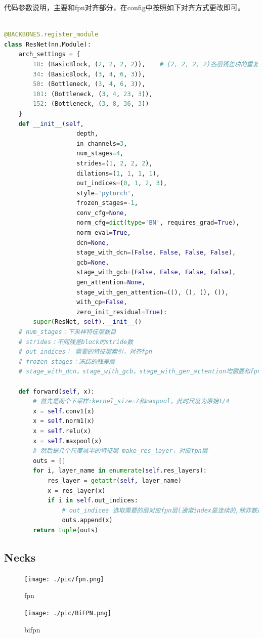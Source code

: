 \documentclass[UTF8]{ctexart}
\begin{document}
代码参数说明，主要和fpn对齐部分，在config中按照如下对齐方式更改即可。
\lstset{style=mystyle}
\begin{lstlisting}[language=Python]

@BACKBONES.register_module
class ResNet(nn.Module):
	arch_settings = {
		18: (BasicBlock, (2, 2, 2, 2)),    # (2, 2, 2, 2)各层残差块的重复数目
		34: (BasicBlock, (3, 4, 6, 3)),
		50: (Bottleneck, (3, 4, 6, 3)),
		101: (Bottleneck, (3, 4, 23, 3)),
		152: (Bottleneck, (3, 8, 36, 3))
	}
	def __init__(self,
					depth,
					in_channels=3,
					num_stages=4,
					strides=(1, 2, 2, 2),
					dilations=(1, 1, 1, 1),
					out_indices=(0, 1, 2, 3),
					style='pytorch',
					frozen_stages=-1,
					conv_cfg=None,
					norm_cfg=dict(type='BN', requires_grad=True),
					norm_eval=True,
					dcn=None,
					stage_with_dcn=(False, False, False, False),
					gcb=None,
					stage_with_gcb=(False, False, False, False),
					gen_attention=None,
					stage_with_gen_attention=((), (), (), ()),
					with_cp=False,
					zero_init_residual=True):
		super(ResNet, self).__init__()
	# num_stages：下采样特征层数目
	# strides：不同残差block的stride数
	# out_indices： 需要的特征层索引，对齐fpn
	# frozen_stages：冻结的残差层
	# stage_with_dcn，stage_with_gcb，stage_with_gen_attention均需要和fpn层对齐

	def forward(self, x):
		# 首先是两个下采样:kernel_size=7和maxpool，此时尺度为原始1/4
		x = self.conv1(x)
		x = self.norm1(x)
		x = self.relu(x)
		x = self.maxpool(x)
		# 然后是几个尺度减半的特征层 make_res_layer，对应fpn层
		outs = []
		for i, layer_name in enumerate(self.res_layers):
			res_layer = getattr(self, layer_name)
			x = res_layer(x)
			if i in self.out_indices:
				# out_indices 选取需要的层对应fpn层(通常index是连续的,除非数据特殊，刚好都只有一大一小物体)
				outs.append(x)
		return tuple(outs)
\end{lstlisting}



\subsection{Necks}
\begin{figure}[htbp]
	\centering
	\texttt{[image: ./pic/fpn.png]}
	\caption{fpn}
	\label{picfpn}
\end{figure}

\begin{figure}[htbp]
	\centering
	\texttt{[image: ./pic/BiFPN.png]}
	\caption{bifpn}
	\label{picbifpn}
\end{figure}
\end{document}
